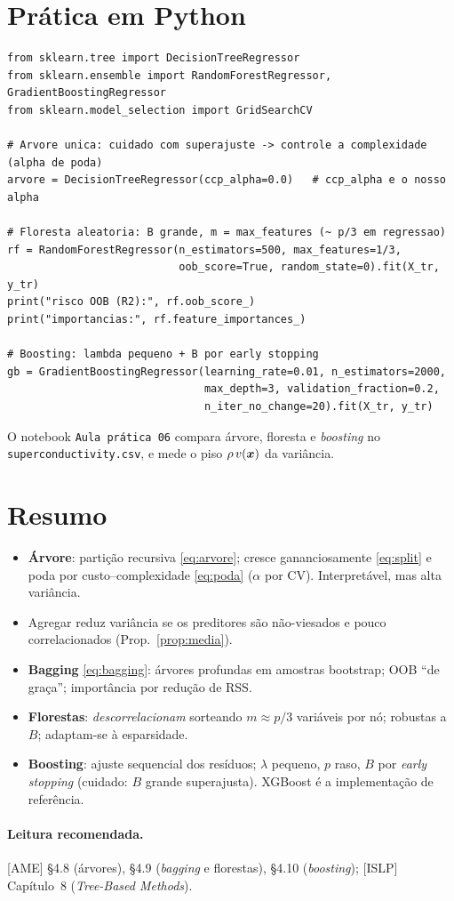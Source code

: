 \documentclass[11pt,a4paper]{article}
\begin{document}
\section{Prática em Python}
\begin{lstlisting}
from sklearn.tree import DecisionTreeRegressor
from sklearn.ensemble import RandomForestRegressor, GradientBoostingRegressor
from sklearn.model_selection import GridSearchCV

# Arvore unica: cuidado com superajuste -> controle a complexidade (alpha de poda)
arvore = DecisionTreeRegressor(ccp_alpha=0.0)   # ccp_alpha e o nosso alpha

# Floresta aleatoria: B grande, m = max_features (~ p/3 em regressao)
rf = RandomForestRegressor(n_estimators=500, max_features=1/3,
                           oob_score=True, random_state=0).fit(X_tr, y_tr)
print("risco OOB (R2):", rf.oob_score_)
print("importancias:", rf.feature_importances_)

# Boosting: lambda pequeno + B por early stopping
gb = GradientBoostingRegressor(learning_rate=0.01, n_estimators=2000,
                               max_depth=3, validation_fraction=0.2,
                               n_iter_no_change=20).fit(X_tr, y_tr)
\end{lstlisting}
O notebook \texttt{Aula prática 06} compara árvore, floresta e \emph{boosting} no
\texttt{superconductivity.csv}, e mede o piso $\rho\,v(\bm{x})$ da variância.

\section*{Resumo}
\begin{itemize}[leftmargin=1.4cm]
  \item \textbf{Árvore}: partição recursiva \eqref{eq:arvore}; cresce
        gananciosamente \eqref{eq:split} e poda por custo--complexidade
        \eqref{eq:poda} ($\alpha$ por CV). Interpretável, mas alta variância.
  \item Agregar reduz variância se os preditores são não-viesados e pouco
        correlacionados (Prop.~\ref{prop:media}).
  \item \textbf{Bagging} \eqref{eq:bagging}: árvores profundas em amostras
        bootstrap; OOB ``de graça''; importância por redução de RSS.
  \item \textbf{Florestas}: \emph{descorrelacionam} sorteando $m\approx p/3$
        variáveis por nó; robustas a $B$; adaptam-se à esparsidade.
  \item \textbf{Boosting}: ajuste sequencial dos resíduos; $\lambda$ pequeno, $p$
        raso, $B$ por \emph{early stopping} (cuidado: $B$ grande superajusta).
        XGBoost é a implementação de referência.
\end{itemize}

\paragraph{Leitura recomendada.} [AME] §4.8 (árvores), §4.9 (\emph{bagging} e
florestas), §4.10 (\emph{boosting}); [ISLP] Capítulo~8 (\emph{Tree-Based Methods}).
\end{document}
